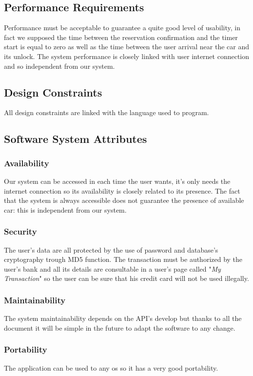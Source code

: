 \subsection{Performance Requirements} \label{sec:perf_requirements}
Performance must be acceptable to guarantee a quite good level of usability, in fact we supposed the time between the reservation confirmation and the timer start is equal to zero as well as the time between the user arrival near the car and its unlock. The system performance is closely linked with user internet connection and so independent from our system.

\subsection{Design Constraints} \label{sec:design_constr}
All design constraints are linked with the language used to program.

\subsection{Software System Attributes} \label{sec:sw_sys_attr}
\subsubsection{Availability} \label{availability}
Our system can be accessed in each time the user wants, it's only needs the internet connection so its availability is closely related to its presence. The fact that the system is always accessible does not guarantee the presence of available car: this is independent from our system.

\subsubsection{Security} \label{security}
The user's data are all protected by the use of password and database's cryptography trough MD5 function. The transaction must be authorized by the user's bank and all its details are consultable in a user's page called "\textit{My Transaction}" so the user can be sure that his credit card will not be used illegally.

\subsubsection{Maintainability} \label{maintainability}
The system maintainability depends on the API's develop but thanks to all the document it will be simple in the future to adapt the software to any change.

\subsubsection{Portability} \label{portability}
The application can be used to any \acs{os} so it has a very good portability.

